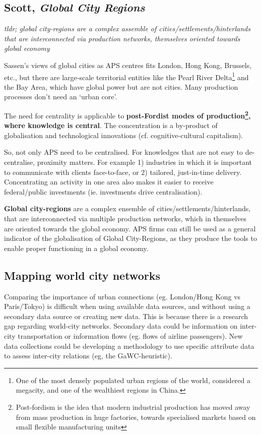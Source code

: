 \documentclass{article}
\begin{document}
\subsection{Scott, \textit{Global City Regions}}

\textit{tldr; global city-regions are a complex assemble of cities/settlements/hinterlands that are interconnected via production networks, themselves oriented towards global economy}

Sassen's views of global cities as APS centres fits London, Hong Kong, Brussels, etc., but there are large-scale territorial entities like the Pearl River Delta\footnote{One of the most densely populated urban regions of the world, considered a megacity, and one of the wealthiest regions in China.} and the Bay Area, which have global power but are not cities. Many production processes don't need an `urban core'.

The need for centrality is applicable to \textbf{post-Fordist modes of production\footnote{Post-fordism is the idea that modern industrial production has moved away from mass production in huge factories, towards specialised markets based on small flexible manufacturing units}, where knowledge is central}. The concentration is a by-product of globalisation and technological innovations (cf. cognitive-cultural capitalism). 

So, not only APS need to be centralised. For knowledges that are not easy to de-centralise, proximity matters. For example 1) industries in which it is important to communicate with clients face-to-face, or 2) tailored, just-in-time delivery. Concentrating an activity in one area also makes it easier to receive federal/public investments (ie. investments drive centralisation).

\textbf{Global city-regions} are a complex ensemble of cities/settlements/hinterlands, that are interconnected via multiple production networks, which in themselves are oriented towards the global economy. APS firms can still be used as a general indicator of the globalisation of Global City-Regions, as they produce the tools to enable proper functioning in a global economy.

\subsection{Mapping world city networks}

Comparing the importance of urban connections (eg. London/Hong Kong vs Paris/Tokyo) is difficult when using available data sources, and without using a secondary data source or creating new data.
This is because there is a research gap regarding world-city networks.
Secondary data could be information on inter-city transportation or information flows (eg. flows of airline passengers). New data collections could be developing a methodology to use specific attribute data to assess inter-city relations (eg, the GaWC-heuristic).
\end{document}
